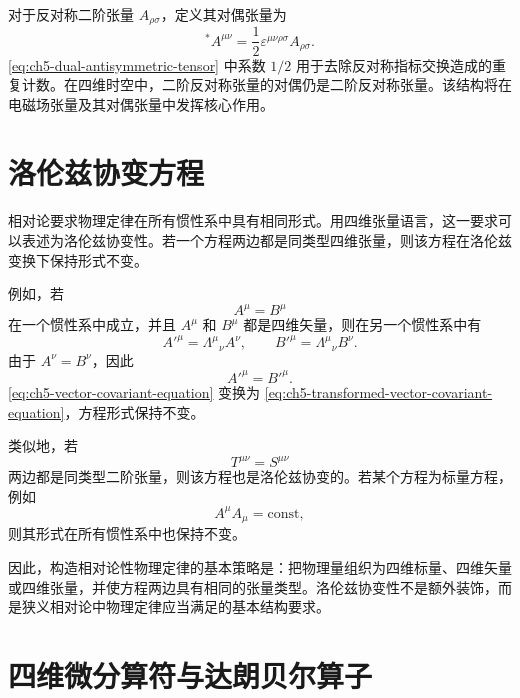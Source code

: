 对于反对称二阶张量 $A_{\rho\sigma}$，定义其对偶张量为
\begin{equation}
\label{eq:ch5-dual-antisymmetric-tensor}
{}^{*}A^{\mu\nu}
=
\frac{1}{2}\varepsilon^{\mu\nu\rho\sigma}A_{\rho\sigma}.
\end{equation}
\eqref{eq:ch5-dual-antisymmetric-tensor} 中系数 $1/2$ 用于去除反对称指标交换造成的重复计数。在四维时空中，二阶反对称张量的对偶仍是二阶反对称张量。该结构将在电磁场张量及其对偶张量中发挥核心作用。

\section{洛伦兹协变方程}

相对论要求物理定律在所有惯性系中具有相同形式。用四维张量语言，这一要求可以表述为洛伦兹协变性。若一个方程两边都是同类型四维张量，则该方程在洛伦兹变换下保持形式不变。

例如，若
\begin{equation}
\label{eq:ch5-vector-covariant-equation}
A^{\mu}=B^{\mu}
\end{equation}
在一个惯性系中成立，并且 $A^{\mu}$ 和 $B^{\mu}$ 都是四维矢量，则在另一个惯性系中有
\[
A'^{\mu}=\Lambda^{\mu}{}_{\nu} A^{\nu},
\qquad
B'^{\mu}=\Lambda^{\mu}{}_{\nu} B^{\nu}.
\]
由于 $A^{\nu}=B^{\nu}$，因此
\begin{equation}
\label{eq:ch5-transformed-vector-covariant-equation}
A'^{\mu}=B'^{\mu}.
\end{equation}
\eqref{eq:ch5-vector-covariant-equation} 变换为 \eqref{eq:ch5-transformed-vector-covariant-equation}，方程形式保持不变。

类似地，若
\[
T^{\mu\nu}=S^{\mu\nu}
\]
两边都是同类型二阶张量，则该方程也是洛伦兹协变的。若某个方程为标量方程，例如
\[
A^{\mu} A_{\mu}=\text{const},
\]
则其形式在所有惯性系中也保持不变。

因此，构造相对论性物理定律的基本策略是：把物理量组织为四维标量、四维矢量或四维张量，并使方程两边具有相同的张量类型。洛伦兹协变性不是额外装饰，而是狭义相对论中物理定律应当满足的基本结构要求。

\section{四维微分算符与达朗贝尔算子}

